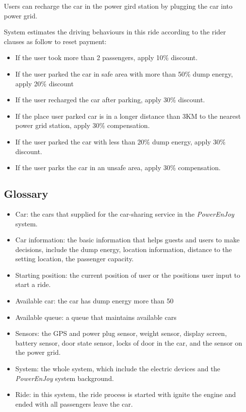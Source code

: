 \documentclass[a4paper,11pt]{article}
\begin{document}
Users can recharge the car in the power gird station by plugging the car into power grid.

System estimates the driving behaviours in this ride according to the rider clauses as follow to reset payment:
	\begin{itemize}
	\item If the user took more than 2 passengers, apply 10\% discount.
	\item If the user parked the car in safe area with more than 50\% dump energy, apply 20\% discount
	\item If the user recharged the car after parking, apply 30\% discount.
	\item If the place user parked car is in a longer distance than 3KM to the nearest power grid station, apply 30\% compensation.
	\item If the user parked the car with less than 20\% dump energy, apply 30\% discount.
	\item If the user parks the car in an unsafe area, apply 30\% compensation.
	\end{itemize}
		    
	\subsection{Glossary}
	\begin{itemize}
	\item Car: the cars that supplied for the car-sharing service in the \textsl{PowerEnJoy} system.
	\item Car information: the basic information that helps guests and users to make decisions, include the dump energy, location information, distance to the setting location, the passenger capacity.
	\item Starting position: the current position of user or the positions user input to start a ride.
	\item Available car: the car has dump energy more than 50%
	\item Available queue: a queue that maintains available cars 
	\item Sensors: the GPS and power plug sensor, weight sensor, display screen, battery sensor, door state sensor, locks of door in the car, and the sensor on the power grid. 
	\item System: the whole system, which include the electric devices and the \textsl{PowerEnJoy} system background.
	\item Ride: in this system, the ride process is started with ignite the engine and ended with all passengers leave the car.

	\end{itemize}
	
\end{document}
